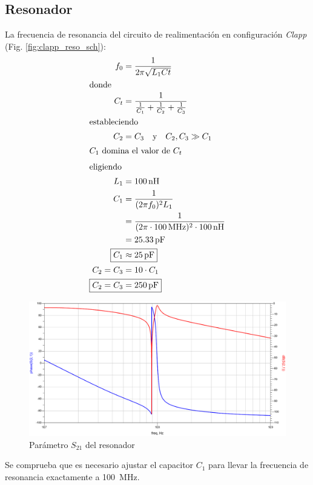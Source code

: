 \documentclass[journal]{IEEEtran}
\begin{document}
\subsection{Resonador}
La frecuencia de resonancia del circuito de realimentación en configuración \emph{Clapp} (Fig. \ref{fig:clapp_reso_sch}):
\begin{align*}
    f_0 &=\frac{1}{2\pi \sqrt{L_1 Ct}}\\
    \intertext{donde}
    C_t &=\frac{1}{\frac{1}{C_1}+\frac{1}{C_2}+\frac{1}{C_3}}\\
    \intertext{estableciendo}
    C_2 &=C_3 \quad \text{y} \quad C_2,C_3 \gg C_1\\
    \intertext{$C_1$ domina el valor de $C_t$}
    \intertext{eligiendo}
    L_1 &=\SI{100}{\nano\henry}\\
    C_1 &= \frac{1}{(2\pi f_0)^2 L_1}\\
    &= \frac{1}{(2\pi \cdot \SI{100}{\mega\hertz})^2\cdot \SI{100}{\nano\henry}}\\
    &=\SI{25.33}{\pico\farad}\\
    \Aboxed{C_1 &\approx \SI{25}{\pico\farad}}\\
    C_2=C_3 &= 10\cdot C_1\\
    \Aboxed{C_2=C_3 &= \SI{250}{\pico\farad}}
\end{align*}

\begin{figure}[H]
\centering
\includegraphics[width=1\linewidth]{capturas/clapp_reso_bode-cropped.pdf}
\caption{Parámetro $S_{21}$ del resonador}
\label{fig:clapp_reso_s21}
\end{figure}

Se comprueba que es necesario ajustar el capacitor $C_1$ para llevar la frecuencia de resonancia exactamente a \SI{100}{\mega\hertz}.
\end{document}
